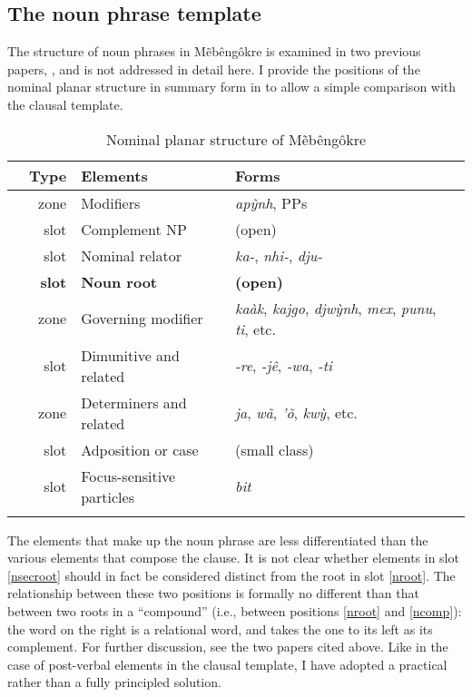 \documentclass[output=paper]{langscibook}
\begin{document}

\subsection{The noun phrase template}
\label{noun-phrase}

The structure of noun phrases in Mẽbêngôkre is examined in two previous papers, \citet{salanova:SN-amazonicas,salanova:count}, and is not addressed in detail here. I provide the positions of the nominal planar structure in summary form in  to allow a simple comparison with the clausal template.

\begin{table}
\caption{Nominal planar structure of Mẽbêngôkre}
\label{tab:n-planar}
\begin{tabular}{Trlp{0.35\textwidth}p{0.35\textwidth}} \lsptoprule
	      & Type & Elements & Forms \\ \midrule
\label{nmods}&zone&Modifiers&{\em apỹnh}, PPs\\
\label{ncomp}&slot&Complement NP&(open)\\
\label{nrel}&slot&Nominal relator&{\em ka-}, {\em nhi-}, {\em dju-}\\
{\bfseries \label{nroot}}&{\bfseries slot}&{\bfseries Noun root}&{\bfseries (open)}\\
\label{nsecroot}&zone&Governing modifier&{\em kaàk}, {\em kajgo}, {\em djwỳnh}, {\em mex}, {\em punu}, {\em ti}, etc.\\
\label{ndim}&slot&Dimunitive and related&{\em -re}, {\em -jê}, {\em -wa}, {\em -ti}\\
\label{ndet}&zone&Determiners and related&{\em ja}, {\em wã}, {\em 'õ}, {\em kwỳ}, etc.\\
\label{nadp}&slot&Adposition or case&(small class)\\
\label{nfoc}&slot&Focus-sensitive particles&{\em bit}\\
\lspbottomrule
\end{tabular}
\end{table}

The elements that make up the noun phrase are less differentiated than the various elements that compose the clause. It is not clear whether elements in slot \ref{nsecroot} should in fact be considered distinct from the root in slot \ref{nroot}. The relationship between these two positions is formally no different than that between two roots in a ``compound'' (i.e., between positions \ref{nroot} and \ref{ncomp}): the word on the right is a relational word, and takes the one to its left as its complement. For further discussion, see the two papers cited above. Like in the case of post-verbal elements in the clausal template, I have adopted a practical rather than a fully principled solution. %
\end{document}
